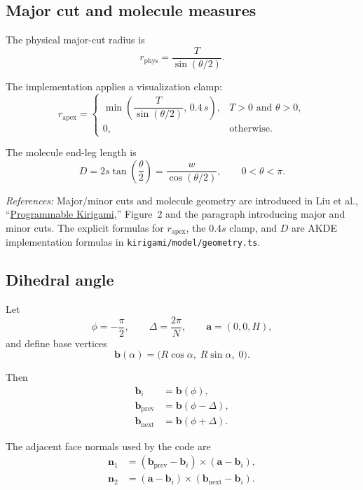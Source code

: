 \documentclass[11pt]{article}
\newcommand{\formularefs}[1]{%
\par\smallskip
\noindent\footnotesize\textit{References: }#1
\par\smallskip\normalsize
}
\begin{document}
\subsection{Major cut and molecule measures}

The physical major-cut radius is
\[
r_{\mathrm{phys}} = \frac{T}{\sin(\theta/2)}.
\]

The implementation applies a visualization clamp:
\begin{equation}
r_{\mathrm{apex}} =
\begin{cases}
\min\!\left(\dfrac{T}{\sin(\theta/2)},\,0.4\,s\right), & T>0 \text{ and } \theta>0,\\[8pt]
0, & \text{otherwise.}
\end{cases}
\end{equation}

The molecule end-leg length is
\begin{equation}
D = 2s\tan\!\left(\frac{\theta}{2}\right)
= \frac{w}{\cos(\theta/2)},
\qquad
0 < \theta < \pi.
\end{equation}

\formularefs{Major/minor cuts and molecule geometry are introduced in Liu et al., ``\href{https://static1.squarespace.com/static/5783b6f903596e5098f3fce8/t/5dd2e95aee053940522eab1a/1574103423054/DETC2019-97557.pdf}{Programmable Kirigami},'' Figure~2 and the paragraph introducing major and minor cuts. The explicit formulas for \(r_{\mathrm{apex}}\), the \(0.4s\) clamp, and \(D\) are AKDE implementation formulas in \texttt{kirigami/model/geometry.ts}.}

\subsection{Dihedral angle}

Let
\[
\phi = -\frac{\pi}{2},
\qquad
\Delta = \frac{2\pi}{N},
\qquad
\mathbf{a} = (0,0,H),
\]
and define base vertices
\[
\mathbf{b}(\alpha) = \bigl(R\cos\alpha,\; R\sin\alpha,\; 0\bigr).
\]

Then
\begin{align*}
\mathbf{b}_i &= \mathbf{b}(\phi), \\
\mathbf{b}_{\mathrm{prev}} &= \mathbf{b}(\phi-\Delta), \\
\mathbf{b}_{\mathrm{next}} &= \mathbf{b}(\phi+\Delta).
\end{align*}

The adjacent face normals used by the code are
\begin{align}
\mathbf{n}_1 &= (\mathbf{b}_{\mathrm{prev}}-\mathbf{b}_i) \times (\mathbf{a}-\mathbf{b}_i), \\
\mathbf{n}_2 &= (\mathbf{a}-\mathbf{b}_i) \times (\mathbf{b}_{\mathrm{next}}-\mathbf{b}_i).
\end{align}
\end{document}
